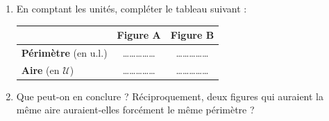 \documentclass[a4paper]{book}
\begin{document}
\begin{exercice}
    
        \begin{enumerate}
            \item En comptant les unités, compléter le tableau suivant :
            
            \begin{center}
            \renewcommand{\arraystretch}{1.5}
            \begin{tabularx}{0.8\textwidth}{|X|c|c|}
            \hline
             & \textbf{Figure A} & \textbf{Figure B} \\
            \hline
            \textbf{Périmètre} (en u.l.) & \dots\dots\dots\dots\dots & \dots\dots\dots\dots\dots \\
            \hline
            \textbf{Aire} (en $\mathcal{U}$) & \dots\dots\dots\dots\dots & \dots\dots\dots\dots\dots \\
            \hline
            \end{tabularx}
            \end{center}
        
            \item Que peut-on en conclure ? Réciproquement, deux figures qui auraient la même aire auraient-elles forcément le même périmètre ? \newline
        \end{enumerate}
    \end{exercice}
    
\end{document}
